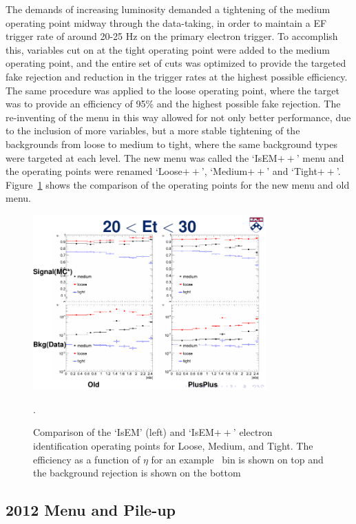 The demands of increasing luminosity demanded a tightening of the medium operating point midway through the data-taking, in order to maintain a EF trigger rate of around 20-25 Hz on the primary electron trigger. To accomplish this, variables cut on at the tight operating point were added to the medium operating point, and the entire set of cuts was optimized to provide the targeted fake rejection and reduction in the trigger rates at the highest possible efficiency. The same procedure was applied to the loose operating point, where the target was to provide an efficiency of 95\% and the highest possible fake rejection. The re-inventing of the menu in this way allowed for not only better performance, due to the inclusion of more variables, but a more stable tightening of the backgrounds from loose to medium to tight, where the same background types were targeted at each level. The new menu was called the `IsEM$++$' menu and the operating points were renamed `Loose$++$', `Medium$++$' and `Tight$++$'. Figure~\ref{figure:electron_isemvpp} shows the comparison of the operating points for the new menu and old menu.

\begin{figure}[!t]
\centering 
\includegraphics[width=0.80\textwidth]{figs/electron/isEMvsisEMPP.pdf}
\caption {Comparison of the `IsEM' (left) and `IsEM$++$' electron identification operating points for Loose, Medium, and Tight. The efficiency as a function of $\eta$ for an example \pt\ bin is shown on top and the background rejection is shown on the bottom}.
\label{figure:electron_isemvpp}
\end{figure}

\subsection{2012 Menu and Pile-up}

